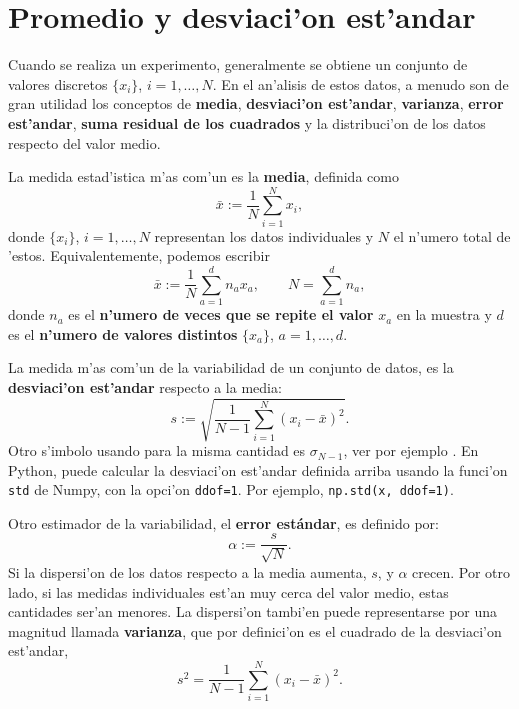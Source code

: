 \documentclass[letterpaper,11pt]{report}
\begin{document}
\section{Promedio y desviaci'on est'andar}

Cuando se realiza un experimento, generalmente se obtiene un conjunto de valores discretos $\lbrace x_i\rbrace$, $i=1,\dots,N$.  En el an'alisis de estos datos, a menudo son de gran utilidad los conceptos de \textbf{media}, \textbf{desviaci'on est'andar}, \textbf{varianza}, \textbf{error est'andar}, \textbf{suma residual de los cuadrados}  y la distribuci'on de los datos respecto del valor medio. 

La medida estad'istica m'as com'un es la \textbf{media}, definida como
\begin{equation}
\bar{x}:=\frac{1}{N}\sum_{i=1}^N x_i,
\end{equation}
donde $\lbrace x_i\rbrace$, $i=1,\dots,N$ representan los datos individuales y $N$ el n'umero total de 'estos.
Equivalentemente, podemos escribir
\begin{equation}
\bar{x}:=\frac{1}{N}\sum_{a=1}^{d} n_a x_a, \qquad N=\sum_{a=1}^{d} n_a,
\end{equation}
donde $n_a$ es el \textbf{n'umero de veces que se repite el valor} $x_a$ en la muestra y $d$ es el \textbf{n'umero de valores distintos} $\lbrace x_a\rbrace$, $a=1,\dots,d$.
%
%
%

La medida m'as com'un de la variabilidad de un conjunto de datos, es la \textbf{desviaci'on est'andar} respecto a la media:
\begin{equation}
s:=\sqrt{\frac{1}{N-1}\sum_{i=1}^N(x_i-\bar{x})^2}.
\end{equation}
Otro s'imbolo usando para la misma cantidad es $\sigma_{N-1}$, ver por ejemplo \cite{HH2010}. En Python, puede calcular la desviaci'on est'andar definida arriba usando la funci'on \texttt{std} de Numpy, con la opci'on \texttt{ddof=1}. Por ejemplo, \texttt{np.std(x, ddof=1)}.

Otro estimador de la variabilidad, el \textbf{error estándar}, es definido por:
\begin{equation}
\alpha:=\frac{s}{\sqrt{N}}.
\end{equation}
Si la dispersi'on de los datos respecto a la media aumenta, $s$, y $\alpha$ crecen. Por otro lado, si las medidas individuales est'an muy cerca del valor medio, estas cantidades ser'an menores. La dispersi'on tambi'en puede representarse por una magnitud llamada \textbf{varianza}, que por definici'on es el cuadrado de la desviaci'on est'andar,
\begin{equation}
s^2=\frac{1}{N-1}\sum_{i=1}^N(x_i-\bar{x})^2.
\end{equation}
\end{document}
